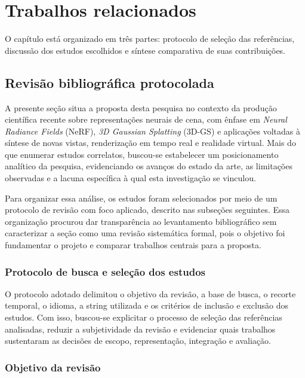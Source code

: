 \chapter{Trabalhos relacionados}

O capítulo está organizado em três partes: protocolo de seleção das referências, discussão dos estudos escolhidos e síntese comparativa de suas contribuições.

\section{Revisão bibliográfica protocolada}

A presente seção situa a proposta desta pesquisa no contexto da produção científica recente sobre representações neurais de cena, com ênfase em \textit{Neural Radiance Fields} (NeRF), \textit{3D Gaussian Splatting} (3D-GS) e aplicações voltadas à síntese de novas vistas, renderização em tempo real e realidade virtual. Mais do que enumerar estudos correlatos, buscou-se estabelecer um posicionamento analítico da pesquisa, evidenciando os avanços do estado da arte, as limitações observadas e a lacuna específica à qual esta investigação se vinculou.

Para organizar essa análise, os estudos foram selecionados por meio de um protocolo de revisão com foco aplicado, descrito nas subseções seguintes. Essa organização procurou dar transparência ao levantamento bibliográfico sem caracterizar a seção como uma revisão sistemática formal, pois o objetivo foi fundamentar o projeto e comparar trabalhos centrais para a proposta.

\subsection{Protocolo de busca e seleção dos estudos}

O protocolo adotado delimitou o objetivo da revisão, a base de busca, o recorte temporal, o idioma, a string utilizada e os critérios de inclusão e exclusão dos estudos. Com isso, buscou-se explicitar o processo de seleção das referências analisadas, reduzir a subjetividade da revisão e evidenciar quais trabalhos sustentaram as decisões de escopo, representação, integração e avaliação.

\subsection{Objetivo da revisão}

